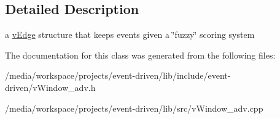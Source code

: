 \subsection{Detailed Description}
a \hyperlink{classev_1_1vEdge}{v\+Edge} structure that keeps events given a \char`\"{}fuzzy\char`\"{} scoring system 

The documentation for this class was generated from the following files\+:\begin{DoxyCompactItemize}
\item 
/media/workspace/projects/event-\/driven/lib/include/event-\/driven/v\+Window\+\_\+adv.\+h\item 
/media/workspace/projects/event-\/driven/lib/src/v\+Window\+\_\+adv.\+cpp\end{DoxyCompactItemize}
